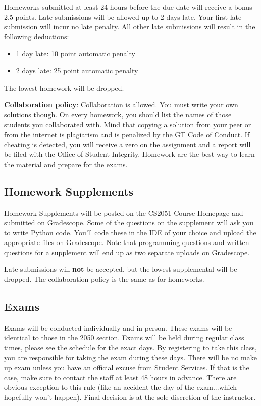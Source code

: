 \documentclass{article}
\begin{document}
    \vspace{3mm}
    Homeworks submitted at least 24 hours before the due date will receive a bonus 2.5 points. Late submissions will be allowed up to 2 days late.  Your first late submission will incur no late penalty. All other late submissions will result in the following deductions: 
    \begin{itemize}
        \item 1 day late: 10 point automatic penalty 
        \item 2 days late: 25 point automatic penalty
    \end{itemize}
    The lowest homework will be dropped.
    
    \vspace{3mm}
    \textbf{Collaboration policy}: Collaboration is allowed. You must write your own solutions though. On every homework, you should list the names of those students you collaborated with. Mind that copying a solution from your peer or from the internet is plagiarism and is penalized by the GT Code of Conduct. If cheating is detected, you will receive a zero on the assignment and a report will be filed with the Office of Student Integrity. Homework are the best way to learn the material and prepare for the exams.

\subsection*{Homework Supplements}
    Homework Supplements will be posted on the CS2051 Course Homepage and submitted on Gradescope. Some of the questions on the supplement will ask you to write Python code. You’ll code these in the IDE of your choice and upload the appropriate files on Gradescope. Note that programming questions and written questions for a supplement will end up as two separate uploads on Gradescope.

    \vspace{3mm}
    Late submissions will \textbf{not} be accepted, but the lowest supplemental will be dropped. The collaboration policy is the same as for homeworks.

\subsection*{Exams}
    Exams will be conducted individually and in-person. These exams will be identical to those in the 2050 section. Exams will be held during regular class times, please see the schedule for the exact days. By registering to take this class, you are responsible for taking the exam during these days. There will be no make up exam unless you have an official excuse from Student Services. If that is the case, make sure to contact the staff at least 48 hours in advance. There are obvious exception to this rule (like an accident the day of the exam...which hopefully won’t happen). Final decision is at the sole discretion of the instructor.
\end{document}
